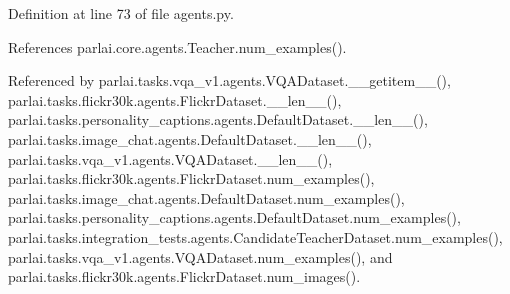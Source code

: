 Definition at line 73 of file agents.\+py.



References parlai.\+core.\+agents.\+Teacher.\+num\+\_\+examples().



Referenced by parlai.\+tasks.\+vqa\+\_\+v1.\+agents.\+V\+Q\+A\+Dataset.\+\_\+\+\_\+getitem\+\_\+\+\_\+(), parlai.\+tasks.\+flickr30k.\+agents.\+Flickr\+Dataset.\+\_\+\+\_\+len\+\_\+\+\_\+(), parlai.\+tasks.\+personality\+\_\+captions.\+agents.\+Default\+Dataset.\+\_\+\+\_\+len\+\_\+\+\_\+(), parlai.\+tasks.\+image\+\_\+chat.\+agents.\+Default\+Dataset.\+\_\+\+\_\+len\+\_\+\+\_\+(), parlai.\+tasks.\+vqa\+\_\+v1.\+agents.\+V\+Q\+A\+Dataset.\+\_\+\+\_\+len\+\_\+\+\_\+(), parlai.\+tasks.\+flickr30k.\+agents.\+Flickr\+Dataset.\+num\+\_\+examples(), parlai.\+tasks.\+image\+\_\+chat.\+agents.\+Default\+Dataset.\+num\+\_\+examples(), parlai.\+tasks.\+personality\+\_\+captions.\+agents.\+Default\+Dataset.\+num\+\_\+examples(), parlai.\+tasks.\+integration\+\_\+tests.\+agents.\+Candidate\+Teacher\+Dataset.\+num\+\_\+examples(), parlai.\+tasks.\+vqa\+\_\+v1.\+agents.\+V\+Q\+A\+Dataset.\+num\+\_\+examples(), and parlai.\+tasks.\+flickr30k.\+agents.\+Flickr\+Dataset.\+num\+\_\+images().

